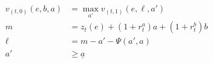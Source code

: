 \begin{align} \tag{1}
    v_{(t,0)}(e, b, a) & = \max_{a'} v_{(t,1)}(e, \ell, a')
    \\
    m                  & = z_t(e) + (1 + r_t^a)a + (1 + r_t^b)b
    \\
    \ell               & = m - a' - \Psi(a', a)
    \\
    a'                 & \geq \underline{a}
\end{align}
